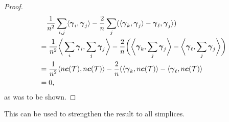 \begin{proof}
\begin{align*}
	&\quad \frac{1}{n^2}\sum_{i,j} \langle \vb*{\gamma}_i,\vb*{\gamma}_j\rangle - \frac{2}{n}\sum_j (\langle \vb*{\gamma}_k,\vb*{\gamma}_j\rangle -\vb*{\gamma}_\ell,\vb*{\gamma}_j\rangle) \\
	&= \frac{1}{n^2}\bigg\langle \sum_i\vb*{\gamma}_i,\sum_j\vb*{\gamma}_j\bigg\rangle - \frac{2}{n}\bigg(\bigg\langle \vb*{\gamma}_k,\sum_j\vb*{\gamma}_j\bigg\rangle 
	 -\bigg\langle \vb*{\gamma}_\ell,\sum_j\vb*{\gamma}_j\bigg\rangle\bigg) \\
	&= \frac{1}{n^2}\langle n\vb*{c}(\mathcal{T}),n\vb*{c}(\mathcal{T})\rangle - \frac{2}{n}(\langle \vb*{\gamma}_k,n\vb*{c}(\mathcal{T})\rangle - \langle \vb*{\gamma}_\ell,n\vb*{c}(\mathcal{T})\rangle \\
	&= 0,
	\end{align*}
	as was to  be shown. 
\end{proof}

This can be used  to strengthen   the  result to  all simplices. 

